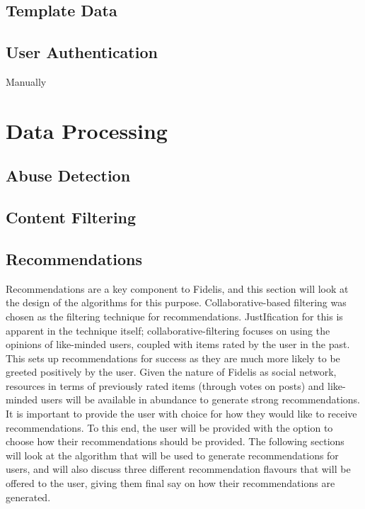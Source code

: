 \subsection{Template Data}


\subsection{User Authentication}
Manually

\section{Data Processing}
\subsection{Abuse Detection}
\subsection{Content Filtering}
\subsection{Recommendations}
Recommendations are a key component to Fidelis, and this section will look at the design of the algorithms for this purpose. Collaborative-based filtering was chosen as the filtering technique for recommendations. JustIfication for this is apparent in the technique itself; collaborative-filtering focuses on using the opinions of like-minded users, coupled with items rated by the user in the past. This sets up recommendations for success as they are much more likely to be greeted positively by the user. Given the nature of Fidelis as social network, resources in terms of previously rated items (through votes on posts) and like-minded users will be available in abundance to generate strong recommendations. It is important to provide the user with choice for how they would like to receive recommendations. To this end, the user will be provided with the option to choose how their recommendations should be provided. The following sections will look at the algorithm that will be used to generate recommendations for users, and will also discuss three different recommendation flavours that will be offered to the user, giving them final say on how their recommendations are generated. 

